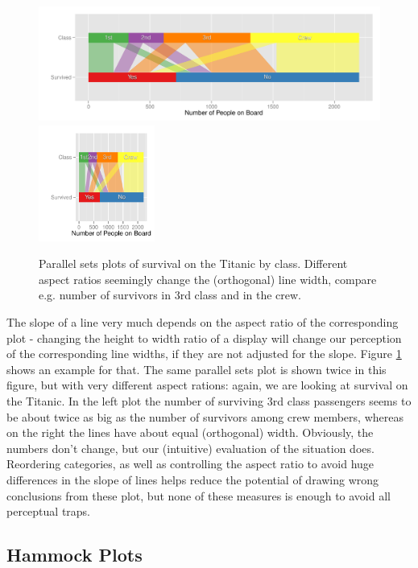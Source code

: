 \begin{figure}[htbp]
\begin{center}
\includegraphics[height=1.5in]{images/aspect31-titanic.pdf}
\includegraphics[height=1.5in]{images/aspect33-titanic.pdf}
\end{center}
\caption{\label{fig:aspect}Parallel sets plots of survival on the Titanic by class. Different aspect ratios  seemingly change the (orthogonal) line width, compare e.g. number of survivors in 3rd class and in the crew. }
\end{figure}

The slope of a line very much depends on the aspect ratio of the corresponding plot - changing the height to width ratio of a display  will change our perception of the corresponding line widths, if they are not adjusted for the slope. Figure \ref{fig:aspect} shows an example for that. The same parallel sets plot is shown twice in this figure, but with very different aspect rations: again, we are looking at survival on the Titanic. In the left plot the number of surviving 3rd class passengers seems to be about twice as big as the number of survivors among crew members, whereas on the right the lines have about equal (orthogonal) width. Obviously, the numbers don't change, but our (intuitive) evaluation of the situation does. Reordering categories, as well as controlling the aspect ratio to avoid huge differences in the slope of lines helps reduce the potential of drawing wrong conclusions from these plot, but none of these measures is enough to avoid all perceptual traps.
\subsection{Hammock Plots}

